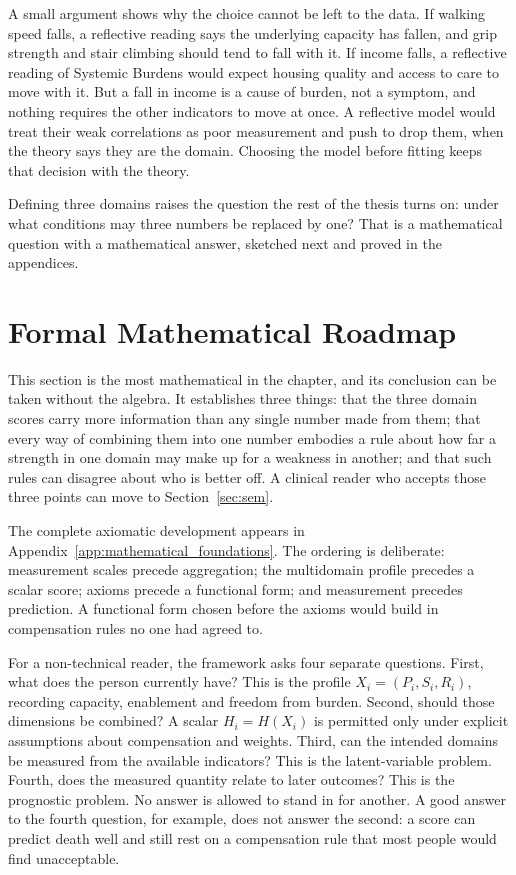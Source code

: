 A small argument shows why the choice cannot be left to the data. If walking speed falls, a reflective reading says the underlying capacity has fallen, and grip strength and stair climbing should tend to fall with it. If income falls, a reflective reading of Systemic Burdens would expect housing quality and access to care to move with it. But a fall in income is a cause of burden, not a symptom, and nothing requires the other indicators to move at once. A reflective model would treat their weak correlations as poor measurement and push to drop them, when the theory says they are the domain. Choosing the model before fitting keeps that decision with the theory.

Defining three domains raises the question the rest of the thesis turns on: under what conditions may three numbers be replaced by one? That is a mathematical question with a mathematical answer, sketched next and proved in the appendices.

\section{Formal Mathematical Roadmap}
\label{sec:roadmap}

This section is the most mathematical in the chapter, and its conclusion can be taken without the algebra. It establishes three things: that the three domain scores carry more information than any single number made from them; that every way of combining them into one number embodies a rule about how far a strength in one domain may make up for a weakness in another; and that such rules can disagree about who is better off. A clinical reader who accepts those three points can move to Section~\ref{sec:sem}.


The complete axiomatic development appears in
Appendix~\ref{app:mathematical_foundations}. The ordering is deliberate:
measurement scales precede aggregation; the multidomain profile precedes a
scalar score; axioms precede a functional form; and measurement precedes
prediction. A functional form chosen before the axioms would build in
compensation rules no one had agreed to.

For a non-technical reader, the framework asks four separate questions.
First, what does the person currently have? This is the profile
$X_i=(P_i,S_i,R_i)$, recording capacity, enablement and freedom from burden.
Second, should those dimensions be combined? A scalar
$H_i=H(X_i)$ is permitted only under explicit assumptions about compensation
and weights. Third, can the intended domains be measured from the available
indicators? This is the latent-variable problem. Fourth, does the measured
quantity relate to later outcomes? This is the prognostic problem. No answer is
allowed to stand in for another. A good answer to the fourth question, for
example, does not answer the second: a score can predict death well and still
rest on a compensation rule that most people would find unacceptable.

